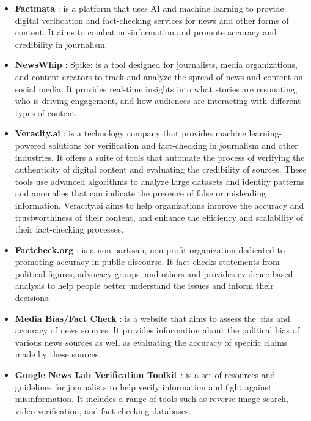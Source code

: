 \documentclass[target=mst,aauheader=]{thud}
\begin{document}
\begin{itemize} 

    \item \textbf{Factmata} \cite{factmata}: is a platform that uses AI and machine learning to provide digital verification and fact-checking services for news and other forms of content. It aims to combat misinformation and promote accuracy and credibility in journalism.
    \item \textbf{NewsWhip} \cite{NewsWhip}: Spike: is a tool designed for journalists, media organizations, and content creators to track and analyze the spread of news and content on social media. It provides real-time insights into what stories are resonating, who is driving engagement, and how audiences are interacting with different types of content.
    \item \textbf{Veracity.ai} \cite{veracityAi}: is a technology company that provides machine learning-powered solutions for verification and fact-checking in journalism and other industries. It offers a suite of tools that automate the process of verifying the authenticity of digital content and evaluating the credibility of sources. These tools use advanced algorithms to analyze large datasets and identify patterns and anomalies that can indicate the presence of false or misleading information. Veracity.ai aims to help organizations improve the accuracy and trustworthiness of their content, and enhance the efficiency and scalability of their fact-checking processes.
    \item \textbf{Factcheck.org} \cite{Factcheck}: is a non-partisan, non-profit organization dedicated to promoting accuracy in public discourse. It fact-checks statements from political figures, advocacy groups, and others and provides evidence-based analysis to help people better understand the issues and inform their decisions.
    \item \textbf{Media Bias/Fact Check} \cite{mediabiasfactcheck}: is a website that aims to assess the bias and accuracy of news sources. It provides information about the political bias of various news sources as well as evaluating the accuracy of specific claims made by these sources.
    \item \textbf{Google News Lab Verification Toolkit} \cite{googleVerificationToolkit}: is a set of resources and guidelines for journalists to help verify information and fight against misinformation. It includes a range of tools such as reverse image search, video verification, and fact-checking databases.

\end{itemize}
\end{document}
